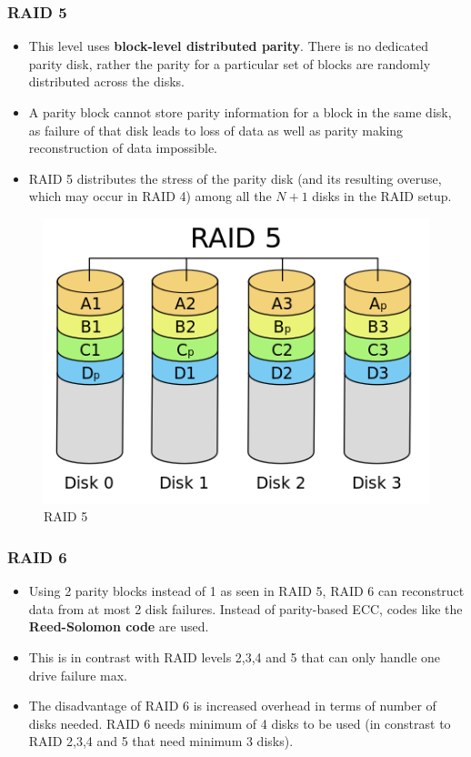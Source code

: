 \documentclass{article}
\theoremstyle{plain}
\theoremstyle{definition}
\begin{document}
\subsubsection{RAID 5}
\begin{itemize}
    \item This level uses \textbf{block-level distributed parity}. There is no dedicated parity disk, rather the parity for a particular set of blocks are randomly distributed across the disks.
    
    \item A parity block cannot store parity information for a block in the same disk, as failure of that disk leads to loss of data as well as parity making reconstruction of data impossible.
    
    \item RAID 5 distributes the stress of the parity disk (and its resulting overuse, which may occur in RAID 4) among all the $N+1$ disks in the RAID setup. 
\end{itemize}

\begin{figure}[!h]
    \centering
    \includegraphics[scale=0.4]{raid5.png}
    \caption{RAID 5}
    \label{fig:my_label_5}
\end{figure}

\subsubsection{RAID 6}
\begin{itemize}
    \item Using 2 parity blocks instead of 1 as seen in RAID 5, RAID 6 can reconstruct data from at most 2 disk failures. Instead of parity-based ECC, codes like the \textbf{Reed-Solomon code} are used.  
    
    \item This is in contrast with RAID levels 2,3,4 and 5 that can only handle one drive failure max. 
    
    \item The disadvantage of RAID 6 is increased overhead in terms of number of disks needed. RAID 6 needs minimum of 4 disks to be used (in constrast to RAID 2,3,4 and 5 that need minimum 3 disks). 
\end{itemize}
\end{document}
